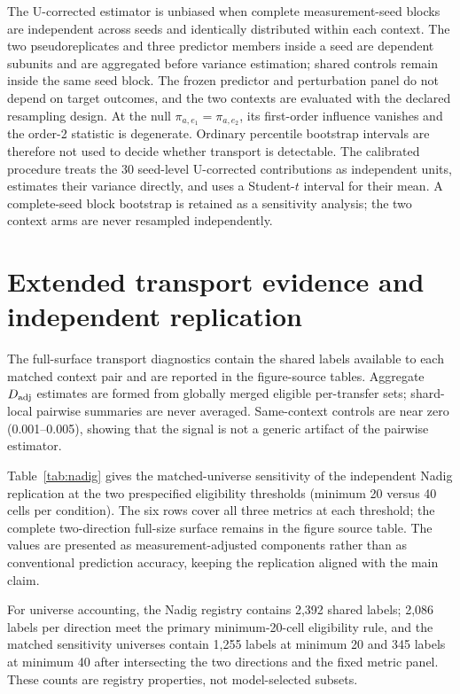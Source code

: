 \documentclass{article}
\begin{document}
The U-corrected estimator is unbiased when complete measurement-seed blocks
are independent across seeds and identically distributed within each context.
The two pseudoreplicates and three predictor members inside a seed are dependent
subunits and are aggregated before variance estimation; shared controls remain
inside the same seed block. The frozen
predictor and perturbation panel do not depend on target outcomes, and the
two contexts are evaluated with the declared resampling design. At the null
$\pi_{a,e_1}=\pi_{a,e_2}$, its first-order influence vanishes and the
order-2 statistic is degenerate. Ordinary percentile bootstrap intervals are
therefore not used to decide whether transport is detectable. The calibrated
procedure treats the 30 seed-level U-corrected contributions as independent
units, estimates their variance directly, and uses a Student-$t$ interval for
their mean. A complete-seed block bootstrap is retained as a sensitivity
analysis; the two context arms are never resampled independently.

\section{Extended transport evidence and independent replication}
\label{app:extended}

The full-surface transport diagnostics contain the shared labels available to each matched context pair and are reported in the figure-source tables. Aggregate $D_{\rm adj}$ estimates are formed from globally merged eligible per-transfer sets; shard-local pairwise summaries are never averaged. Same-context controls are near zero (0.001--0.005), showing that the signal is not a generic artifact of the pairwise estimator.

Table~\ref{tab:nadig} gives the matched-universe sensitivity of the independent Nadig replication at the two prespecified eligibility thresholds (minimum 20 versus 40 cells per condition). The six rows cover all three metrics at each threshold; the complete two-direction full-size surface remains in the figure source table. The values are presented as measurement-adjusted components rather than as conventional prediction accuracy, keeping the replication aligned with the main claim.

For universe accounting, the Nadig registry contains 2,392 shared labels;
2,086 labels per direction meet the primary minimum-20-cell eligibility rule,
and the matched sensitivity universes contain 1,255 labels at minimum 20 and
345 labels at minimum 40 after intersecting the two directions and the fixed
metric panel. These counts are registry properties, not model-selected
subsets.
\end{document}
